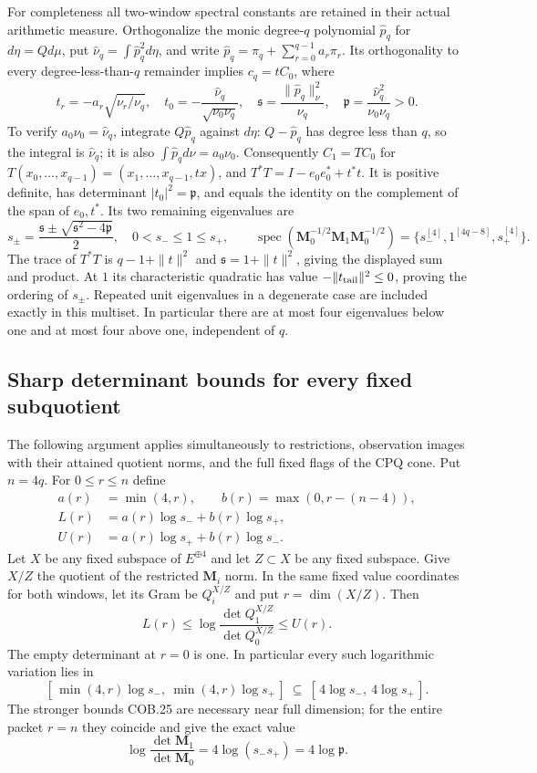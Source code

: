 For completeness all two-window spectral constants are retained in
their actual arithmetic measure.  Orthogonalize the monic degree-$q$
polynomial $\widehat p_q$ for $d\eta=Qd\mu$, put
$\widehat\nu_q=\int\widehat p_q^2d\eta$, and write
$\widehat p_q=\pi_q+\sum_{r=0}^{q-1}a_r\pi_r$.
Its orthogonality to every degree-less-than-$q$ remainder implies
$c_q=tC_0$, where
\[
 t_r=-a_r\sqrt{\nu_r/\nu_q},\quad
 t_0=-\frac{\widehat\nu_q}{\sqrt{\nu_0\nu_q}},\quad
 \mathfrak s=\frac{\|\widehat p_q\|_\nu^2}{\nu_q},\quad
 \mathfrak p=\frac{\widehat\nu_q^2}{\nu_0\nu_q}>0.
 \tag{COB.23}
\]
To verify $a_0\nu_0=\widehat\nu_q$, integrate
$Q\widehat p_q$ against $d\eta$: $Q-\widehat p_q$ has degree
less than $q$, so the integral is $\widehat\nu_q$; it is also
$\int\widehat p_qd\nu=a_0\nu_0$.
Consequently $C_1=TC_0$ for
$T(x_0,\ldots,x_{q-1})=(x_1,\ldots,x_{q-1},tx)$, and
$T^*T=I-e_0e_0^*+t^*t$.  It is positive definite, has determinant
$|t_0|^2=\mathfrak p$, and equals the identity on the complement
of the span of $e_0,t^*$.  Its two remaining eigenvalues are
\[
 s_\pm=\frac{\mathfrak s\pm\sqrt{\mathfrak s^2-4\mathfrak p}}2,
 \quad0<s_-\le1\le s_+,\qquad
 \operatorname{spec}(\mathbf M_0^{-1/2}\mathbf M_1\mathbf M_0^{-1/2})
   =\{s_-^{[4]},1^{[4q-8]},s_+^{[4]}\}.
 \tag{COB.24}
\]
The trace of $T^*T$ is $q-1+\|t\|^2$ and
$\mathfrak s=1+\|t\|^2$, giving the displayed sum and product.
At $1$ its characteristic quadratic has value
$-\|t_{\rm tail}\|^2\le0$, proving the ordering of $s_\pm$.
Repeated unit eigenvalues in a degenerate case are included exactly
in this multiset.  In particular there are at most four eigenvalues
below one and at most four above one, independent of $q$.

\subsection{Sharp determinant bounds for every fixed subquotient}

The following argument applies simultaneously to restrictions,
observation images with their attained quotient norms, and the full
fixed flags of the CPQ cone.  Put $n=4q$.  For $0\le r\le n$ define
\[
 \begin{split}
 a(r)&=\min(4,r),\qquad b(r)=\max(0,r-(n-4)),\\
 L(r)&=a(r)\log s_-+b(r)\log s_+,\\
 U(r)&=a(r)\log s_++b(r)\log s_-.
 \end{split}\tag{COB.25}
\]
Let $X$ be any fixed subspace of $E^{\oplus4}$ and let $Z\subset X$
be any fixed subspace.  Give $X/Z$ the quotient of the restricted
$\mathbf M_i$ norm.  In the same fixed value coordinates for both
windows, let its Gram be $Q_i^{X/Z}$ and put $r=\dim(X/Z)$.
Then
\[
 \boxed{L(r)\le\log\frac{\det Q_1^{X/Z}}{\det Q_0^{X/Z}}\le U(r).}
 \tag{COB.26}
\]
The empty determinant at $r=0$ is one.  In particular every such
logarithmic variation lies in
\[
 [\,\min(4,r)\log s_-,\ \min(4,r)\log s_+\,]
 \ \subseteq\ [\,4\log s_-,\ 4\log s_+\,].
 \tag{COB.27}
\]
The stronger bounds COB.25 are necessary near full dimension;
for the entire packet $r=n$ they coincide and give the exact value
\[
 \log\frac{\det\mathbf M_1}{\det\mathbf M_0}
       =4\log(s_-s_+)=4\log\mathfrak p.
 \tag{COB.28}
\]

